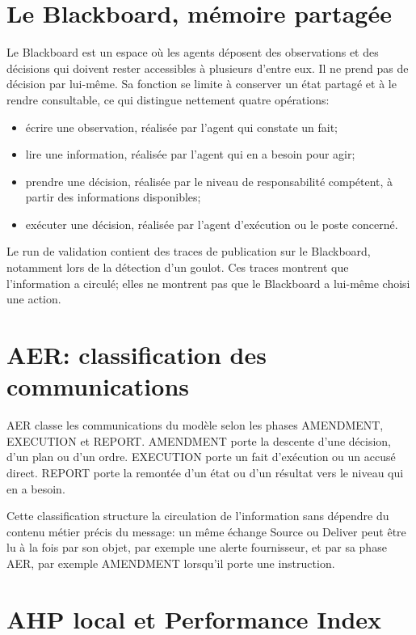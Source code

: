 \section{Le Blackboard, mémoire partagée}

Le Blackboard est un espace où les agents déposent des observations et des décisions qui doivent rester accessibles à plusieurs d'entre eux. Il ne prend pas de décision par lui-même. Sa fonction se limite à conserver un état partagé et à le rendre consultable, ce qui distingue nettement quatre opérations:

\begin{itemize}
  \item écrire une observation, réalisée par l'agent qui constate un fait;
  \item lire une information, réalisée par l'agent qui en a besoin pour agir;
  \item prendre une décision, réalisée par le niveau de responsabilité compétent, à partir des informations disponibles;
  \item exécuter une décision, réalisée par l'agent d'exécution ou le poste concerné.
\end{itemize}

Le run de validation contient des traces de publication sur le Blackboard, notamment lors de la détection d'un goulot. Ces traces montrent que l'information a circulé; elles ne montrent pas que le Blackboard a lui-même choisi une action.

\section{AER: classification des communications}

AER classe les communications du modèle selon les phases AMENDMENT, EXECUTION et REPORT. AMENDMENT porte la descente d'une décision, d'un plan ou d'un ordre. EXECUTION porte un fait d'exécution ou un accusé direct. REPORT porte la remontée d'un état ou d'un résultat vers le niveau qui en a besoin.

Cette classification structure la circulation de l'information sans dépendre du contenu métier précis du message: un même échange Source ou Deliver peut être lu à la fois par son objet, par exemple une alerte fournisseur, et par sa phase AER, par exemple AMENDMENT lorsqu'il porte une instruction.

\section{AHP local et Performance Index}

